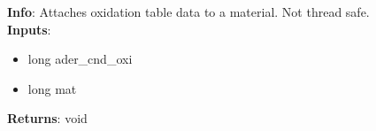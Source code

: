 \textbf{Info}: Attaches oxidation table data to a material. Not thread safe.\\

\noindent \textbf{Inputs}:
\begin{itemize}
\item{long ader\_cnd\_oxi}
\item{long mat}
\end{itemize}

\noindent \textbf{Returns}: void
